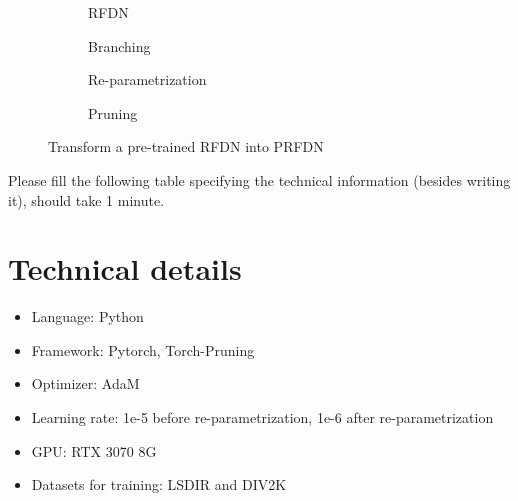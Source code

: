 \documentclass{article}
\begin{document}
\begin{figure}
    \centering
    \begin{subfigure}[b]{0.49\linewidth}
		\centering
        \framebox{}
        \caption{RFDN}
        \label{fig:RFDN}
    \end{subfigure}
    \begin{subfigure}[b]{0.49\linewidth}
		\centering
        \framebox{}
        \caption{Branching}
        \label{fig:Branching}
    \end{subfigure}
    \begin{subfigure}[b]{0.49\linewidth}
		\centering
        \framebox{}
        \caption{Re-parametrization}
        \label{fig:Re-parametrization}
    \end{subfigure}
    \begin{subfigure}[b]{0.49\linewidth}
		\centering
        \framebox{}
        \caption{Pruning}
        \label{fig:Pruning}
    \end{subfigure}
    \caption{Transform a pre-trained RFDN into PRFDN}
    \label{fig:PRFDN}
\end{figure}

\vspace{4mm}
Please fill the following table specifying the technical information (besides writing it), should take 1 minute. 

\begin{table}[]
    \centering
    \caption{FILL THIS TABLE PLEASE}
    \label{tab:my_label}
\end{table}

\section{Technical details}
\begin{itemize}
    \item Language: Python
    \item Framework: Pytorch, Torch-Pruning\cite{fang2023depgraph}
    \item Optimizer: AdaM
    \item Learning rate: 1e-5 before re-parametrization, 1e-6 after re-parametrization
    \item GPU: RTX 3070 8G
    \item Datasets for training: LSDIR and DIV2K
\end{itemize}
\end{document}
